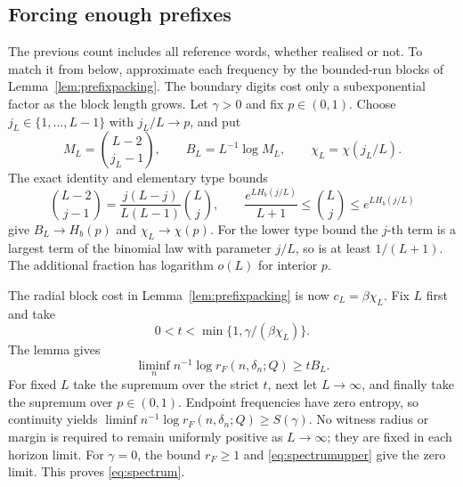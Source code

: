 \documentclass[11pt]{amsart}
\theoremstyle{definition}
\theoremstyle{remark}
\numberwithin{equation}{section}
\begin{document}
\subsection{Forcing enough prefixes}
The previous count includes all reference words, whether realised
or not. To match it from below, approximate each frequency by the
bounded-run blocks of Lemma~\ref{lem:prefixpacking}. The boundary
digits cost only a subexponential factor as the block length grows.
Let $\gamma>0$ and fix $p\in(0,1)$.
Choose $j_L\in\{1,\ldots,L-1\}$ with $j_L/L\to p$, and put
\[
M_L=\binom{L-2}{j_L-1},\qquad
B_L=L^{-1}\log M_L,\qquad \chi_L=\chi(j_L/L).
\]
The exact identity and elementary type bounds
\[
\binom{L-2}{j-1}=\frac{j(L-j)}{L(L-1)}\binom Lj,\qquad
\frac{e^{LH_b(j/L)}}{L+1}\le\binom Lj\le e^{LH_b(j/L)}
\]
give $B_L\to H_b(p)$ and $\chi_L\to\chi(p)$.
For the lower type bound the $j$-th term is a largest term of
the binomial law with parameter $j/L$, so is at least $1/(L+1)$.
The additional fraction has logarithm $o(L)$ for interior $p$.

The radial block cost in Lemma~\ref{lem:prefixpacking} is now
$c_L=\beta\chi_L$. Fix $L$ first and take
\begin{equation}\label{eq:prefixratio}
0<t<\min\{1,\gamma/(\beta\chi_L)\}.
\end{equation}
The lemma gives
\begin{equation}\label{eq:prefixlower}
\liminf_n n^{-1}\log r_F(n,\delta_n;Q)\ge tB_L.
\end{equation}
For fixed $L$ take the supremum over the strict $t$, next let
$L\to\infty$, and finally take the supremum over $p\in(0,1)$.
Endpoint frequencies have zero entropy, so continuity yields
$\liminf n^{-1}\log r_F(n,\delta_n;Q)\ge S(\gamma)$.
No witness radius or margin is required to remain uniformly positive
as $L\to\infty$; they are fixed in each horizon limit.
For $\gamma=0$, the bound $r_F\ge1$ and
\eqref{eq:spectrumupper} give the zero limit.
This proves \eqref{eq:spectrum}.
\end{document}
